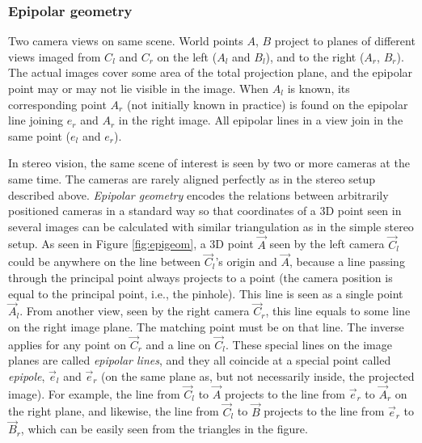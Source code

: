 
\subsubsection{Epipolar geometry} %

{Two camera views on same scene.
World points $A$, $B$ project to planes of different views imaged from $C_l$ and $C_r$ on the left ($A_l$ and $B_l$), and to the right ($A_r$, $B_r$).
The actual images cover some area of the total projection plane, and the epipolar point may or may not lie visible in the image.
When $A_l$ is known, its corresponding point $A_r$ (not initially known in practice) is found on the epipolar line joining $e_r$ and $A_r$ in the right image.
All epipolar lines in a view join in the same point ($e_l$ and $e_r$).}


In stereo vision, the same scene of interest is seen by two or more cameras at the same time.
The cameras are rarely aligned perfectly as in the stereo setup described above.
\emph{Epipolar geometry} \cite[ch. 7.3]{trucco1998introductory} encodes the relations between arbitrarily positioned cameras in a standard way so that coordinates of a 3D point seen in several images can be calculated with similar triangulation as in the simple stereo setup.
\cite{hartley03multiview}
As seen in Figure \ref{fig:epigeom}, a 3D point $\vec A$ seen by the left camera $\vec C_l$ could be anywhere on the line between $\vec C_l$'s origin and $\vec A$, because a line passing through the principal point always projects to a point (the camera position is equal to the principal point, i.e., the pinhole).
This line is seen as a single point $\vec A_l$.
From another view, seen by the right camera $\vec C_r$, this line equals to some line on the right image plane.
The matching point must be on that line.
The inverse applies for any point on $\vec C_r$ and a line on $\vec C_l$.
These special lines on the image planes are called \emph{epipolar lines}, and they all coincide at a special point called \emph{epipole}, $\vec e_l$ and $\vec e_r$ (on the same plane as, but not necessarily inside, the projected image).
For example, the line from $\vec C_l$ to $\vec A$ projects to the line from $\vec e_r$ to $\vec A_r$ on the right plane, and likewise, the line from $\vec C_l$ to $\vec B$ projects to the line from $\vec e_r$ to $\vec B_r$, which can be easily seen from the triangles in the figure.

